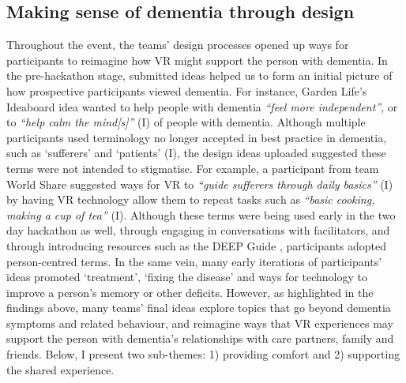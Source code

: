 \subsection{Making sense of dementia through design}
\label{ThemeThree:SenseofDementia}
Throughout the event, the teams' design processes opened up  ways for participants to reimagine how VR might support the person with dementia. In the pre-hackathon stage, submitted ideas helped us to form an initial picture of how prospective participants viewed dementia. For instance, Garden Life’s Ideaboard idea wanted to help people with dementia \textit{``feel more independent''}, or to \textit{``help calm the mind[s]''} (I) of people with dementia. Although multiple participants used terminology no longer accepted in best practice in dementia, such as `sufferers' and `patients' (I), the design ideas uploaded suggested these terms were not intended to stigmatise. For example, a participant from team World Share suggested ways for VR to \textit{``guide sufferers through daily basics''} (I) by having VR technology allow them to repeat tasks such as \textit{``basic cooking, making a cup of tea''} (I). Although these terms were being used early in the two day hackathon as well, through engaging in conversations with facilitators, and through introducing resources such as the DEEP Guide \citep{diaries_deep_2020},  participants adopted person-centred terms. In the same vein, many early iterations of participants’ ideas promoted `treatment', `fixing the disease' and ways for technology to improve a person's memory or other deficits. However, as highlighted in the findings above, many teams’ final ideas explore topics that go beyond dementia symptoms and related behaviour, and reimagine ways that VR experiences may support the person with dementia’s relationships with care partners, family and friends. Below, I present two sub-themes: 1) providing comfort and 2) supporting the shared experience.

